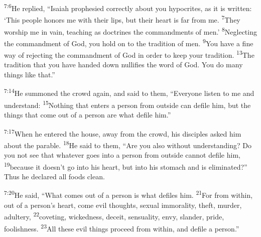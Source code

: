 \documentclass[openany,12pt,english]{book}
\newenvironment{para}{\par\pretolerance=100\tolerance=200\setlength{\emergencystretch}{0.6em}\relax}{\par}
\begin{document}
\begin{para}
    \textsuperscript{7:6}\thinspace{}He replied, “Isaiah prophesied cor\-rect\-ly a\-bout you hypocrites, as it is writ\-ten: ‘This peo\-ple hon\-ors me with their lips, but their heart is far from me.
    \textsuperscript{7}\thinspace{}They wor\-ship me in vain, teach\-ing as doctrines the commandments of men.’
    \textsuperscript{8}\thinspace{}Neglecting the com\-mand\-ment of God, you hold on to the tra\-di\-tion of men.
    \textsuperscript{9}\thinspace{}You have a fi\-ne way of rejecting the com\-mand\-ment of God in or\-der to keep your tra\-di\-tion.
    \textsuperscript{13}\thinspace{}The tra\-di\-tion that you have hand\-ed down nullifies the word of God. You do man\-y things like that.”
\end{para}

\begin{para}
    \textsuperscript{7:14}\thinspace{}He summoned the crowd again, and said to them, “Eve\-ry\-one lis\-ten to me and un\-der\-stand:
    \textsuperscript{15}\thinspace{}Noth\-ing that enters a per\-son from out\-side can de\-file him, but the things that come out of a per\-son are what de\-file him.”
\end{para}

\begin{para}
    \textsuperscript{7:17}\thinspace{}When he entered the house, a\-way from the crowd, his disciples asked him a\-bout the par\-a\-ble.
    \textsuperscript{18}\thinspace{}He said to them, “Are you al\-so with\-out un\-der\-stand\-ing? Do you not see that what\-ev\-er goes in\-to a per\-son from out\-side can\-not de\-file him,
    \textsuperscript{19}\thinspace{}be\-cause it does\-n't go in\-to his heart, but in\-to his stom\-ach and is e\-lim\-i\-nat\-ed?” Thus he de\-clared all foods clean.
\end{para}

\begin{para}
    \textsuperscript{7:20}\thinspace{}He said, “What co\-mes out of a per\-son is what defiles him.
    \textsuperscript{21}\thinspace{}For from with\-in, out of a person's heart, come evil thoughts, sex\-u\-al im\-mo\-ral\-i\-ty, theft, mur\-der, a\-dul\-ter\-y,
    \textsuperscript{22}\thinspace{}coveting, wick\-ed\-ness, de\-ceit, sen\-su\-al\-i\-ty, en\-vy, slan\-der, pride, fool\-ish\-ness.
    \textsuperscript{23}\thinspace{}All these evil things pro\-ceed from with\-in, and de\-file a per\-son.”
\end{para}

\bigskip{}
\end{document}
